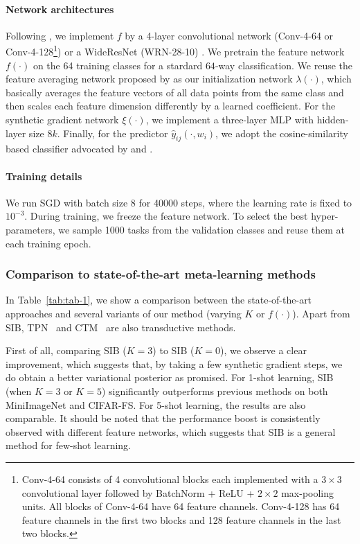 \documentclass{article} \usepackage{iclr2020_conference,times}
\begin{document}
\paragraph{Network architectures}
Following \citet{gidaris2018dynamic,qiao2018few,gidaris2019boosting}, we implement $f$ by a 4-layer convolutional network (Conv-4-64 or Conv-4-128\footnote{
    Conv-4-64 consists of 4 convolutional blocks each implemented with a $3 \times 3$ convolutional layer followed by BatchNorm + ReLU + $2 \times 2$ 
    max-pooling units. All blocks of Conv-4-64 have 64 feature channels. 
    Conv-4-128 has 64 feature channels in the first two blocks and  128 feature channels in the last two blocks.
})
or a WideResNet (WRN-28-10) \citep{zagoruyko2016wide}. We pretrain the feature network $f(\cdot)$ on the 64 training classes for a stardard $64$-way classification.
We reuse the feature averaging network proposed by \citet{gidaris2018dynamic} as our initialization network $\lambda(\cdot)$, 
which basically averages the feature vectors of all data points from the same class and then scales each feature dimension differently by a learned coefficient.
For the synthetic gradient network $\xi(\cdot)$, we implement a three-layer MLP with hidden-layer size $8k$.
Finally, for the predictor $\hat{y}_{ij}(\cdot, w_i)$, we adopt the cosine-similarity based classifier advocated by \citet{chen2019closer} and \citet{gidaris2018dynamic}.


\paragraph{Training details}
We run SGD with batch size $8$ for 40000 steps, where the learning rate is fixed to $10^{-3}$. During training, we freeze the feature network.
To select the best hyper-parameters, we sample 1000 tasks from the validation classes and reuse them at each training epoch. 



\subsubsection{Comparison to state-of-the-art meta-learning methods}
\label{sec:sota}

In Table~\ref{tab:tab-1},
we show a comparison between the state-of-the-art approaches 
and several variants of our method (varying $K$ or $f(\cdot)$).
Apart from SIB, TPN~\citep{liu2018learning} and CTM~\citep{li2019ctm} are also transductive methods.

First of all, comparing SIB ($K=3$) to SIB ($K=0$), 
we observe a clear improvement, 
which suggests that, by taking a few synthetic gradient steps,
we do obtain a better variational posterior as promised.
For 1-shot learning, SIB (when $K=3$ or $K=5$) significantly outperforms previous methods 
on both MiniImageNet and CIFAR-FS. 
For 5-shot learning, the results are also comparable. 
It should be noted that the performance boost is consistently observed 
with different feature networks,
which suggests that SIB is a general method for few-shot learning.
\end{document}
